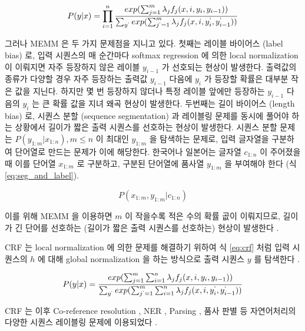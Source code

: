 \documentclass[11pt]{article}
\begin{document}
\begin{equation}
  \label{eq:memm}
  P(y \vert x) = \prod_{i=1}^{n} \frac{exp(\sum_{j=1}^{m} \lambda_j f_j (x, i, y_i, y_{i-1}))}{ \sum_{y^{`}} exp(\sum_{j^{`}=1}^{m} \lambda_j f_j (x, i, y_i^{`}, y_{i-1}^{`})) }
\end{equation}

그러나 MEMM 은 두 가지 문제점을 지니고 있다.
첫째는 레이블 바이어스 (label bias) 로, 입력 시퀀스의 매 순간마다 softmax regression 에 의한 local normalization 이 이뤄지면 자주 등장하지 않은 레이블 $y_{i-1}$ 가 선호되는 현상이 발생한다\citep{lafferty2001conditional, kudo2004applying, andor2016globally}.
출력값의 종류가 다양할 경우 자주 등장하는 출력값 $y_{i-1}$ 다음에 $y_i$ 가 등장할 확률은 대부분 작은 값을 지닌다.
하지만 몇 번 등장하지 않더나 특정 레이블 앞에만 등장하는 $y_{i-1}$ 다음의 $y_i$ 는 큰 확률 값을 지녀 왜곡 현상이 발생한다.
두번째는 길이 바이어스 (length bias) 로, 시퀀스 분할 (sequence segmentation) 과 레이블링 문제를 동시에 풀어야 하는 상황에서 길이가 짧은 출력 시퀀스를 선호하는 현상이 발생한다.
시퀀스 분할 문제는 $P(y_{1:m} \vert x_{1:n}), m \le n$ 이 최대인 $y_{1:m}$ 을 탐색하는 문제로, 입력 글자열을 구분하여 단어열로 만드는 문제가 이에 해당한다.
한국어나 일본어는 글자열 $c_{1:n}$ 이 주어졌을 때 이를 단어열 $x_{1:m}$ 로 구분하고, 구분된 단어열에 품사열 $y_{1:m}$ 을 부여해야 한다 (식 \ref{eq:seg_and_label}).

\begin{equation}
  \label{eq:seg_and_label}
  P(x_{1:m}, y_{1:m} \vert c_{1:n})
\end{equation}

이를 위해 MEMM 을 이용하면 $m$ 이 작을수록 적은 수의 확률 곲이 이뤄지므로, 길이가 긴 단어를 선호하는 (길이가 짧은 출력 시퀀스를 선호하는) 현상이 발생한다 \citep{kudo2004applying}.

CRF 는 local normalization 에 의한 문제를 해결하기 위하여 식 \ref{eq:crf} 처럼 입력 시퀀스의 $h$ 에 대해 global normalization 을 하는 방식으로 출력 시퀀스 $y$ 를 탐색한다 \citep{lafferty2001conditional}.

\begin{equation}
  \label{eq:crf}
  P(y \vert x) = \frac{exp(\sum_{j=1}^{m} \sum_{i=1}^{n} \lambda_j f_j (x, i, y_i, y_{i-1}))}{ \sum_{y^{`}} exp(\sum_{j^{`}=1}^{m} \sum_{i=1}^{n} \lambda_j f_j (x, i, y_i^{`}, y_{i-1}^{`})) }
\end{equation}

CRF 는 이후 Co-reference resolution \citep{mccallum2005conditional}, NER \citep{ritter2011named, minkov2005extracting, ling2012fine, sang2003introduction, sarawagi2005semi}, Parsing \citep{sha2003shallow, finkel2008efficient}, 품사 판별 \citep{toutanova2003feature, gimpel2010part} 등 자연어처리의 다양한 시퀀스 레이블링 문제에 이용되었다 \citep{choi2005identifying, mccallum2003early}. \\
\end{document}
